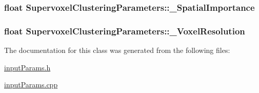 \hypertarget{classSupervoxelClusteringParameters_a531585249d452c5db7e498d865e9770b}{
\subsubsection[{\-\_\-\-Spatial\-Importance}]{\setlength{\rightskip}{0pt plus 5cm}float Supervoxel\-Clustering\-Parameters\-::\-\_\-\-Spatial\-Importance\hspace{0.3cm}{\ttfamily [private]}}}\label{classSupervoxelClusteringParameters_a531585249d452c5db7e498d865e9770b}
\hypertarget{classSupervoxelClusteringParameters_acb807a5e20b4d12322c974b005f72826}{
\subsubsection[{\-\_\-\-Voxel\-Resolution}]{\setlength{\rightskip}{0pt plus 5cm}float Supervoxel\-Clustering\-Parameters\-::\-\_\-\-Voxel\-Resolution\hspace{0.3cm}{\ttfamily [private]}}}\label{classSupervoxelClusteringParameters_acb807a5e20b4d12322c974b005f72826}


The documentation for this class was generated from the following files\-:\begin{DoxyCompactItemize}
\item 
\hyperlink{inputParams_8h}{input\-Params.\-h}\item 
\hyperlink{inputParams_8cpp}{input\-Params.\-cpp}\end{DoxyCompactItemize}

